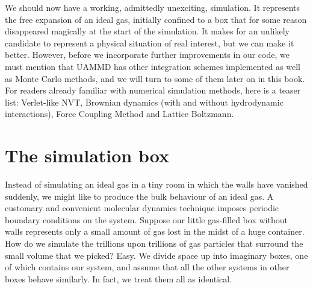 We should now have a working, admittedly unexciting, simulation. It represents 
the free expansion of an ideal gas, initially confined to a box that for some 
reason disappeared magically at the start of the simulation. It makes for an 
unlikely candidate to represent a physical situation of real interest, but we 
can make it better. However, before we incorporate further improvements in our 
code, we must mention that UAMMD has other integration schemes implemented as 
well as Monte Carlo methods, and we will turn to some of them later on in this 
book. For readers already familiar with numerical simulation methods, here is a 
teaser list: Verlet-like NVT, Brownian dynamics (with and without hydrodynamic 
interactions), Force Coupling Method and Lattice Boltzmann.

\section{The simulation box}

Instead of simulating an ideal gas in a tiny room in which the walls have 
vanished suddenly, we might like to produce the bulk behaviour of an ideal gas. 
A customary and convenient molecular dynamics technique imposes periodic 
boundary conditions on the system. Suppose our little gas-filled box without 
walls represents only a small amount of gas lost in the midst of a huge 
container. How do we simulate the trillions upon trillions of gas particles that 
surround the small volume that we picked? Easy. We divide space up into 
imaginary boxes, one of which contains our system, and assume that all the other 
systems in other boxes behave similarly. In fact, we treat them all as 
identical.

